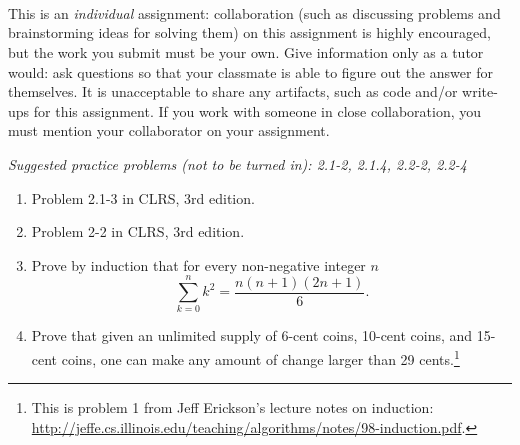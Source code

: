 \documentclass[letterpaper,11pt]{article}
\begin{document}


 \\

 \\

 \\

This is an \emph{individual} assignment: collaboration (such as discussing problems and brainstorming ideas for solving them) on this assignment is highly encouraged, but the work you submit must be your own. Give information only as a tutor would: ask questions so that your classmate is able to figure out the answer for themselves. It is unacceptable to share any artifacts, such as code and/or write-ups for this assignment. If you work with someone in close collaboration, you must mention your collaborator on your assignment.

\emph{Suggested practice problems (not to be turned in): 2.1-2, 2.1.4, 2.2-2, 2.2-4}

\begin{enumerate}
\item Problem 2.1-3 in CLRS, 3rd edition.
\item Problem 2-2 in CLRS, 3rd edition.
\item Prove by induction that for every non-negative integer $n$
\[\sum_{k=0}^{n} k^2 = \frac{n(n+1)(2n+1)}{6}.\]
\item Prove that given an unlimited supply of 6-cent coins, 10-cent coins, and 15-cent coins, one can make any amount of change larger than 29 cents.\footnote{This is problem 1 from Jeff Erickson's lecture notes on induction: \url{http://jeffe.cs.illinois.edu/teaching/algorithms/notes/98-induction.pdf}.}
\end{enumerate}
\end{document}
